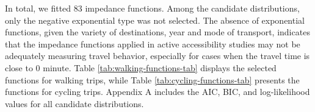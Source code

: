 \documentclass[preprint, 3p,
authoryear]{elsarticle} %
\begin{document}
In total, we fitted 83 impedance functions. Among the candidate
distributions, only the negative exponential type was not selected. The
absence of exponential functions, given the variety of destinations,
year and mode of transport, indicates that the impedance functions
applied in active accessibility studies may not be adequately measuring
travel behavior, especially for cases when the travel time is close to 0
minute. Table \ref{tab:walking-functions-tab} displays the selected
functions for walking trips, while Table \ref{tab:cycling-functions-tab}
presents the functions for cycling trips. Appendix A includes the AIC,
BIC, and log-likelihood values for all candidate distributions.

\begin{table}
\centering
\caption{\label{tab:selected_functions}\label{tab:walking-functions-tab}Impedance functions and AIC for walking trips.}
\centering
{}
\end{table}
\end{document}
